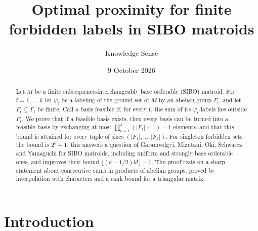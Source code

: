 \documentclass{amsart}
\theoremstyle{definition}
\theoremstyle{remark}
\begin{document}
\title[Proximity for forbidden labels in SIBO matroids]{Optimal proximity for finite forbidden labels in SIBO matroids}

\author{Knowledge Sense}
\address{Knowledge Sense}

\date{9 October 2026}



\begin{abstract}
Let $M$ be a finite subsequence-interchangeably base orderable (SIBO) matroid. For $t=1,\dots,k$ let $\psi_t$ be a labeling of the ground set of $M$ by an abelian group $\Gamma_t$, and let $F_t\subseteq\Gamma_t$ be finite. Call a basis feasible if, for every $t$, the sum of its $\psi_t$-labels lies outside $F_t$. We prove that if a feasible basis exists, then every basis can be turned into a feasible basis by exchanging at most $\prod_{t=1}^k(|F_t|+1)-1$ elements, and that this bound is attained for every tuple of sizes $(|F_1|,\dots,|F_k|)$. For singleton forbidden sets the bound is $2^k-1$; this answers a question of Garamv\"olgyi, Mizutani, Oki, Schwarcz and Yamaguchi for SIBO matroids, including uniform and strongly base orderable ones, and improves their bound $\lfloor(e-1/2)k!\rfloor-1$. The proof rests on a sharp statement about consecutive sums in products of abelian groups, proved by interpolation with characters and a rank bound for a triangular matrix.
\end{abstract}

\maketitle

\section{Introduction}
\end{document}
